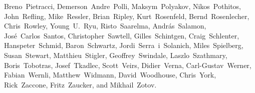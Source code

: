 {Breno~Pietracci,        %
Demerson~Andre~Polli,   %
Maksym~Polyakov,        %
Nikos~Pothitos,		%
John~Refling,           %
Mike~Ressler,           %
Brian~Ripley,           %
Kurt~Rosenfeld,		%
Bernd~Rosenlecher,      %
Chris~Rowley,           %
Young~U.~Ryu,           %
Risto~Saarelma,         %
Andr{\'a}s~Salamon,     %
Jos\'e~Carlos~Santos,   %
Christopher~Sawtell,    %
Gilles~Schintgen,       %
Craig~Schlenter,        %
Hanspeter~Schmid,       %
Baron~Schwartz,         %
Jordi~Serra~i~Solanich, %
Miles~Spielberg,        %
Susan~Stewart,
Matthieu~Stigler,
Geoffrey~Swindale,      %
Laszlo~Szathmary,       %
Boris~Tobotras,         %
Josef~Tkadlec,          %
Scott~Veirs,            %
Didier~Verna,           %
Carl-Gustav~Werner,     %
Fabian~Wernli,          %
Matthew~Widmann,        %
David~Woodhouse,        %
Chris~York,             %
Rick~Zaccone,           %
Fritz~Zaucker,          %
and Mikhail~Zotov.      %
}




\pagebreak
\endinput
%

